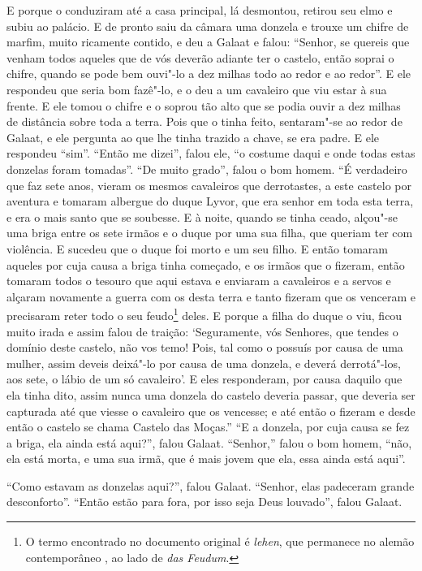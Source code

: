 E porque o conduziram até a casa principal, lá desmontou, retirou seu elmo e
subiu ao palácio. E de pronto saiu da câmara uma donzela e trouxe um chifre de
marfim, muito ricamente contido, e deu a Galaat e falou: “Senhor, se quereis
que venham todos aqueles que de vós deverão adiante ter o castelo, então soprai
o chifre, quando se pode bem ouvi"-lo a dez milhas todo ao redor e ao redor”. E
ele respondeu que seria bom fazê"-lo, e o deu a um cavaleiro que viu estar à sua
frente. E ele tomou o chifre e o soprou tão alto que se podia ouvir a dez
milhas de distância sobre toda a terra. Pois que o tinha feito, sentaram"-se ao
redor de Galaat, e ele pergunta ao que lhe tinha trazido a chave, se era padre.
E ele respondeu “sim”. “Então me dizei”, falou ele, “o costume daqui e onde
todas estas donzelas foram tomadas”. “De muito grado”, falou o bom homem. “É
verdadeiro que faz sete anos, vieram os mesmos cavaleiros que derrotastes, a
este castelo por aventura e tomaram albergue do duque Lyvor, que era senhor em
toda esta terra, e era o mais santo que se soubesse. E à noite, quando se tinha
ceado, alçou"-se uma briga entre os sete irmãos e o duque por uma sua filha, que
queriam ter com violência. E sucedeu que o duque foi morto e um seu filho. E
então tomaram aqueles por cuja causa a briga tinha começado, e os irmãos que o
fizeram, então tomaram todos o tesouro que aqui estava e enviaram a cavaleiros
e a servos e alçaram novamente a guerra com os desta terra e tanto fizeram que
os venceram e precisaram reter todo o seu feudo\footnote{ O termo encontrado no
documento original é\textit{ lehen}, que permanece no alemão contemporâneo
, ao lado de \textit{das Feudum}.} deles. E porque
a filha do duque o viu, ficou muito irada e assim falou de traição:
‘Seguramente, vós Senhores, que tendes o domínio deste castelo, não vos temo!
Pois, tal como o possuís por causa de uma mulher, assim deveis deixá"-lo por
causa de uma donzela, e deverá derrotá"-los, aos sete, o lábio de um só
cavaleiro’. E eles responderam, por causa daquilo que ela tinha dito, assim
nunca uma donzela do castelo deveria passar, que deveria ser capturada até que
viesse o cavaleiro que os vencesse; e até então o fizeram e desde então o
castelo se chama Castelo das Moças.” “E a donzela, por cuja causa se fez a
briga, ela ainda está aqui?”, falou Galaat. “Senhor,” falou o bom homem, “não,
ela está morta, e uma sua irmã, que é mais jovem que ela, essa ainda está
aqui”. 

“Como estavam as donzelas aqui?”, falou Galaat. “Senhor, elas padeceram grande
desconforto”. “Então estão para fora, por isso seja Deus louvado”, falou Galaat. 

